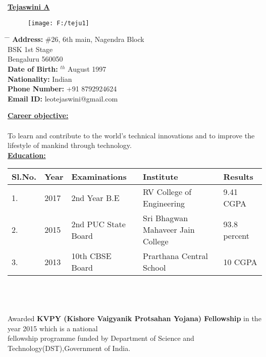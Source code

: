 \documentclass[10pt]{article}
\begin{document}
\hspace{4cm}
\underline{\textbf{\huge{Tejaswini A}}}

\begin{figure}[h]
	\hspace{5cm}
	\texttt{[image: F:/teju1]}
\end{figure}

\parbox{1.5\textwidth}{
	\begin{tabbing} 
		\hspace{3cm} \= \hspace{10cm} \= \kill
		{\bf Address:} \> \#26, 6th main, Nagendra Block\\ 
		\> BSK 1st Stage\\ 
		\> Bengaluru 560050\\
		{\bf Date of Birth:} $^{th}$ August 1997  \\ 
		{\bf Nationality:} \> Indian\\
		{\bf Phone Number:} \> +91 8792924624\\
		{\bf Email ID:} \>leotejaswini@gmail.com\\
\end{tabbing}}
\hfill

\underline{\textbf{\Large{Career objective:}}}\\\\To learn and contribute to the world's technical innovations and to improve the lifestyle of mankind through technology.
\hfill\\
	
\underline{\textbf{\Large{Education:}}}
\vspace{0.5cm}


\begin{tabular}{|p{1.5cm}|p{1.5cm}|p{5cm}|p{4.5cm}|p{2.5cm}|}
	\hline
	\textbf{Sl.No.} & \textbf{Year} & \textbf{Examinations} & \textbf{Institute} & \textbf{Results}\\ [0.5ex] 
	\hline
	1. & 2017 &2nd Year B.E &RV College of Engineering& 9.41 CGPA \\ 
	\hline
	2. & 2015 &2nd PUC State Board & Sri Bhagwan Mahaveer Jain College& 93.8 percent \\
	\hline
	3. & 2013 & 10th CBSE Board & Prarthana Central School &10 CGPA \\
	\hline
	
\end{tabular}
\\\\\\
Awarded \textbf{KVPY (Kishore Vaigyanik Protsahan Yojana) Fellowship} in the year 2015 which is a national\\ fellowship  programme funded by Department of Science and Technology(DST),Government of India.
\hfill 
\end{document}
